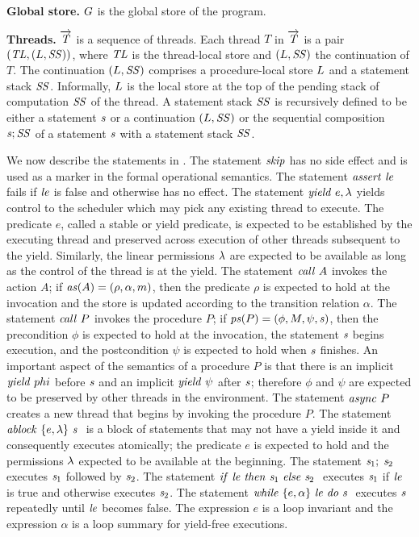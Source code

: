 \noindent
{\bf Global store.}
$G$ is the global store of the program.

\noindent
{\bf Threads.}
$\overrightarrow{\mathit{T}}$ is a sequence of threads.
Each thread $T$ in $\overrightarrow{\mathit{T}}$ is a pair $(\mathit{TL}, (L, \mathit{SS}))$, where $\mathit{TL}$ is the thread-local 
store and $(L, \mathit{SS})$ the continuation of $T$.  
The continuation $(L, \mathit{SS})$ comprises a procedure-local store $L$ and a statement stack $\mathit{SS}$.
Informally, $L$ is the local store at the top of the pending stack of computation $\mathit{SS}$ of the thread.
A statement stack $\mathit{SS}$ is recursively defined to be either a statement $\mathit{s}$ 
or a continuation $(L,\mathit{SS})$ or the sequential composition $\mathit{s};\mathit{SS}$ of a statement $\mathit{s}$ with 
a statement stack $\mathit{SS}$.

We now describe the statements in \civl.
The statement $\mathit{skip}$ has no side effect and is used as a marker in the formal operational semantics.
The statement $\mathit{assert}\ \mathit{le}$ fails if $\mathit{le}$ is false and otherwise has no effect.
The statement $\mathit{yield}\ e,\lambda$ yields control to the scheduler which may pick any existing thread to execute.
The predicate $e$, called a stable or yield predicate, is expected to be established by the executing thread and preserved across
execution of other threads subsequent to the yield.
Similarly, the linear permissions $\lambda$ are expected to be available as long as the control of the thread
is at the yield.
The statement $\mathit{call}\ A$ invokes the action $A$;
if $\mathit{as}(A) = (\rho, \alpha, m)$, then the predicate $\rho$ is expected to hold at the invocation and 
the store is updated according to the transition relation $\alpha$.
The statement $\mathit{call}\ P$ invokes the procedure $P$;
if $\mathit{ps}(P) = (\phi, M, \psi, \mathit{s})$, then the precondition $\phi$ is expected to hold at the invocation,
the statement $\mathit{s}$ begins execution, and the postcondition $\psi$ is expected to hold when $\mathit{s}$ finishes.
An important aspect of the semantics of a procedure $P$ is that there is an implicit $\mathit{yield}\ phi$ before $\mathit{s}$
and an implicit $\mathit{yield}\ \psi$ after $\mathit{s}$; therefore $\phi$ and $\psi$ are expected to be preserved by other threads in the environment. 
The statement $\mathit{async}\ P$ creates a new thread that begins by invoking the procedure $P$.
The statement $\mathit{ablock}\ {\{e,\lambda\}}\ {\mathit{s}}\ $ is a block of statements that may not have a yield inside it and consequently executes atomically;
the predicate $e$ is expected to hold and the permissions $\lambda$ expected to be available at the beginning.
The statement $\mathit{s}_1;\;\mathit{s}_2$ executes $\mathit{s}_1$ followed by $\mathit{s}_2$.
The statement ${\mathit{if}\ {\mathit{le}}\ }{\mathit{then}\ {\mathit{s}_1}\ }{\mathit{else}\ {\mathit{s}_2}\ }$ executes $\mathit{s}_1$ if $\mathit{le}$ is true and otherwise executes $\mathit{s}_2$.
The statement $\mathit{while}\ \{{e,\alpha}\}\ {{\mathit{le}}\ } \mathit{do}\ {{\mathit{s}}\ }$ executes $\mathit{s}$ repeatedly until $\mathit{le}$ becomes false.
The expression $e$ is a loop invariant and the expression $\alpha$ is a loop summary for yield-free executions.

